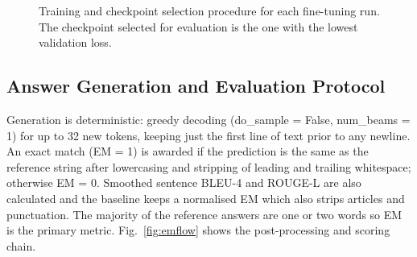 \documentclass[12pt]{report}
\begin{document}
\begin{figure}[htbp]
  \centering
  \caption{Training and checkpoint selection procedure for each fine-tuning run. The checkpoint selected for evaluation is the one with the lowest validation loss.}
  \label{fig:trainflow}
\end{figure}

\subsection{Answer Generation and Evaluation Protocol}
Generation is deterministic: greedy decoding (do\_sample = False, num\_beams = 1) for up to 32 new tokens, keeping just the first line of text prior to any newline. An exact match (EM = 1) is awarded if the prediction is the same as the reference string after lowercasing and stripping of leading and trailing whitespace; otherwise EM = 0. Smoothed sentence BLEU-4 and ROUGE-L are also calculated and the baseline keeps a normalised EM which also strips articles and punctuation. The majority of the reference answers are one or two words so EM is the primary metric. Fig.~\ref{fig:emflow} shows the post-processing and scoring chain.
\end{document}

